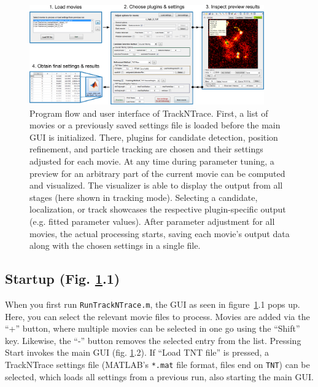 \documentclass[11pt,onside]{report}
\numberwithin{equation}{chapter}
\begin{document}
\begin{figure}[!h]
\centering
\includegraphics[width=0.9\textwidth]{./fig0.pdf} 
\caption{Program flow and user interface of TrackNTrace. First, a list of movies or a previously saved settings file is loaded before the main GUI is initialized. There, plugins for candidate detection, position refinement, and particle tracking are chosen and their settings adjusted for each movie. At any time during parameter tuning, a preview for an arbitrary part of the current movie can be computed and visualized. The visualizer is able to display the output from all stages (here shown in tracking mode). Selecting a candidate, localization, or track showcases the respective plugin-specific output (e.g. fitted parameter values). After parameter adjustment for all movies, the actual processing starts, saving each movie's output data along with the chosen settings in a single file.}
\label{fig:flowdiagram}
\end{figure}

\subsection{Startup (Fig. \ref{fig:flowdiagram}.1)}
When you first run \texttt{RunTrackNTrace.m}, the GUI as seen in figure~\ref{fig:flowdiagram}.1 pops up. Here, you can select the relevant movie files to process. Movies are added via the ``\textsf{+}'' button, where multiple movies can be selected in one go using the ``\textsf{Shift}'' key. Likewise, the ``\textsf{-}'' button removes the selected entry from the list. Pressing \textsf{Start} invokes the main GUI (fig. \ref{fig:flowdiagram}.2). If ``\textsf{Load TNT file}'' is pressed, a TrackNTrace settings file (MATLAB's \texttt{*.mat} file format, files end on \texttt{\textunderscore TNT}) can be selected, which loads all settings from a previous run, also starting the main GUI.
\end{document}
